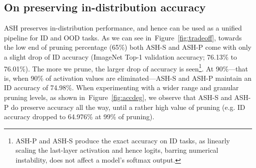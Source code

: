 \documentclass{article}
\newcommand{\figref}[1]{Figure~\ref{fig:#1}}
\newcommand{\tablabel}[1]{\label{tab:#1}}
\begin{document}
\begin{table}[hbt!]
\centering 
{}
\caption{\textbf{OOD detection results on CIFAR benchmarks.}  indicates larger values are better and  indicates smaller values are better. All values are percentages. Results are averaged accross 6 OOD datasets. Methods except for ASH variants (marked as ``Ours'') are taken from~\citet{sun2022dice}.}
\tablabel{main_cifar_results}

\end{table}


\subsection{On preserving in-distribution accuracy}



ASH preserves in-distribution performance, and hence can be used as a unified pipeline for ID and OOD tasks.
As we can see in~\figref{tradeoff}, towards the low end of pruning percentage (65\%) both ASH-S and ASH-P come with only a slight drop of ID accuracy (ImageNet Top-1 validation accuracy; 76.13\% to 76.01\%). The more we prune, the larger drop of accuracy is seen\footnote{ASH-P and ASH-S produce the exact accuracy on ID tasks, as linearly scaling the last-layer activation and hence logits, barring numerical instability, does not affect a model's softmax output.}. At 90\%---that is, when 90\% of activation values are eliminated---ASH-S and ASH-P maintain an ID accuracy of 74.98\%. 
When experimenting with a wider range and granular pruning levels, as shown in~\figref{accdeg}, we observe that ASH-S and ASH-P do preserve accuracy all the way, until a rather high value of pruning (e.g. ID accuracy dropped to 64.976\% at 99\% of pruning).
\end{document}
